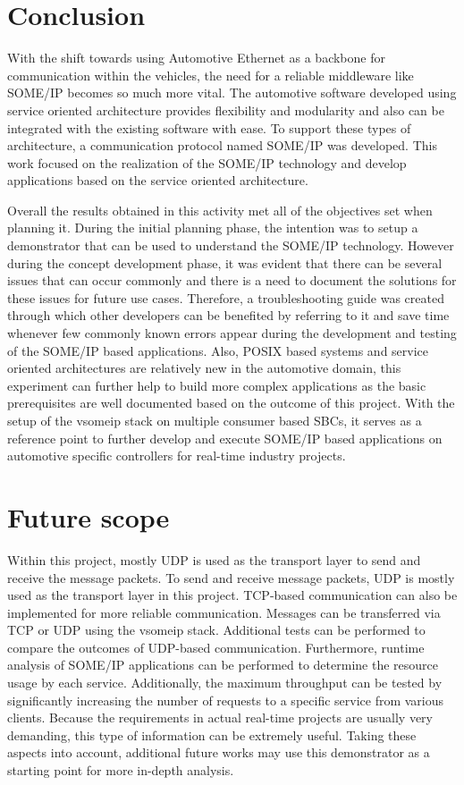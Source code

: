 \section{Conclusion}
With the shift towards using Automotive Ethernet as a backbone for communication within the vehicles, the need for a reliable middleware like SOME/IP becomes so much more vital. The automotive software developed using service oriented architecture provides flexibility and modularity and also can be integrated with the existing software with ease. To support these types of architecture, a communication protocol named SOME/IP was developed. This work focused on the realization of the SOME/IP technology and develop applications based on the service oriented architecture. 
\par Overall the results obtained in this activity met all of the objectives set when planning it. During the initial planning phase, the intention was to setup a demonstrator that can be used to understand the SOME/IP technology. However during the concept development phase, it was evident that there can be several issues that can occur commonly and there is a need to document the solutions for these issues for future use cases. Therefore, a troubleshooting guide was created through which other developers can be benefited by referring to it and save time whenever few commonly known errors appear during the development and testing of the SOME/IP based applications. Also, POSIX based systems and service oriented architectures are relatively new in the automotive domain, this experiment can further help to build more complex applications as the basic prerequisites are well documented based on the outcome of this project. With the setup of the vsomeip stack on multiple consumer based SBCs, it serves as a reference point to further develop and execute SOME/IP based applications on automotive specific controllers for real-time industry projects.

\section{Future scope}
Within this project, mostly UDP is used as the transport layer to send and receive the message packets. To send and receive message packets, UDP is mostly used as the transport layer in this project. TCP-based communication can also be implemented for more reliable communication. Messages can be transferred via TCP or UDP using the vsomeip stack. Additional tests can be performed to compare the outcomes of UDP-based communication. Furthermore, runtime analysis of SOME/IP applications can be performed to determine the resource usage by each service. Additionally, the maximum throughput can be tested by significantly increasing the number of requests to a specific service from various clients. Because the requirements in actual real-time projects are usually very demanding, this type of information can be extremely useful. Taking these aspects into account, additional future works may use this demonstrator as a starting point for more in-depth analysis.